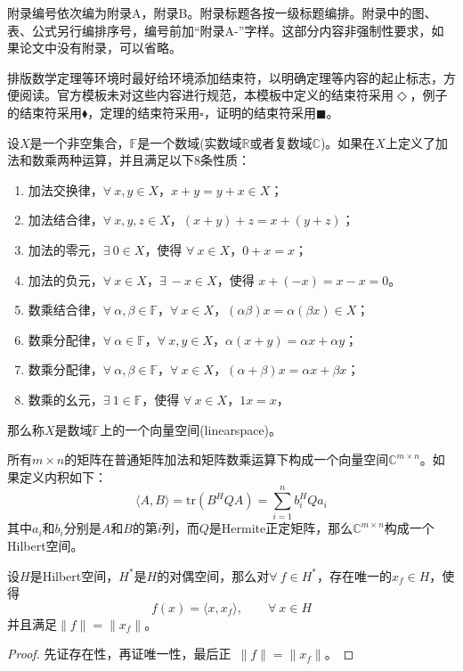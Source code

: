 

附录编号依次编为附录A，附录B。附录标题各按一级标题编排。附录中的图、表、公式另行编排序号，编号前加``附录A-''字样。这部分内容非强制性要求，如果论文中没有附录，可以省略。

排版数学定理等环境时最好给环境添加结束符，以明确定理等内容的起止标志，方便阅读。官方模板未对这些内容进行规范，本模板中定义的结束符采用$\Diamond$，例子的结束符采用$\blacklozenge$，定理的结束符采用$\square$，证明的结束符采用$\blacksquare$。

\begin{definition}[向量空间]
	设$X$是一个非空集合，$\mathbb{F}$是一个数域(实数域$\mathbb{R}$或者复数域$\mathbb{C}$)。如果在$X$上定义了加法和数乘两种运算，并且满足以下8条性质：
	\begin{enumerate}
		\item 加法交换律，$\forall~x,y \in X$，$x+y = y+x \in X$；
		\item 加法结合律，$\forall~x,y,z \in X$，$(x+y)+z = x+(y+z)$；
		\item 加法的零元，$\exists~0 \in X$，使得 $\forall~x \in X$，$0+x = x$；
		\item 加法的负元，$\forall~x \in X$，$\exists~-x \in X$，使得 $x+(-x) = x-x = 0$。
		\item 数乘结合律，$\forall~\alpha,\beta \in \mathbb{F}$，$\forall~x \in X$，$(\alpha\beta)x = \alpha(\beta x) \in X$；
		\item 数乘分配律，$\forall~\alpha \in \mathbb{F}$，$\forall~x,y \in X$，$\alpha(x+y) = \alpha x + \alpha y$；
		\item 数乘分配律，$\forall~\alpha,\beta \in \mathbb{F}$，$\forall~x \in X$，$(\alpha+\beta)x = \alpha x + \beta x$；
		\item 数乘的幺元，$\exists~1 \in \mathbb{F}$，使得 $\forall~x \in X$，$1 x = x$，
	\end{enumerate}
	那么称$X$是数域$\mathbb{F}$上的一个{\heiti 向量空间}(linearspace)。
\end{definition}

\begin{example}[矩阵空间]
	所有$m\times n$的矩阵在普通矩阵加法和矩阵数乘运算下构成一个向量空间$\mathbb{C}^{m\times n}$。如果定义内积如下：
	\begin{equation}
	\langle A,B\rangle=\mathrm{tr}(B^HQA)=\sum_{i=1}^{n}b_i^HQa_i
	\end{equation}
	其中$a_i$和$b_i$分别是$A$和$B$的第$i$列，而$Q$是Hermite正定矩阵，那么$\mathbb{C}^{m\times n}$构成一个Hilbert空间。
\end{example}

\begin{theorem}[Riesz表示定理]
	设$H$是Hilbert空间，$H^{\ast}$是$H$的对偶空间，那么对$\forall~f\in H^{\ast}$，存在唯一的$x_f\in H$，使得
	\begin{equation}
	f(x)=\langle x,x_f\rangle,\qquad\forall~x\in H
	\end{equation}
	并且满足$\|f\|=\|x_f\|$。
\end{theorem}

\begin{proof}
	先证存在性，再证唯一性，最后正~$\|f\|=\|x_f\|$。
\end{proof}
